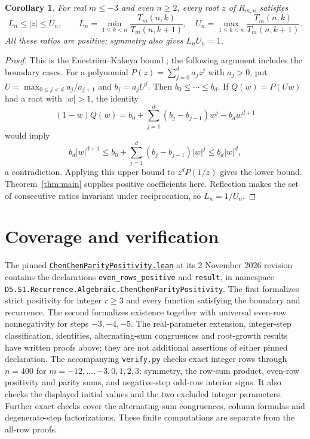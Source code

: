 \documentclass[11pt]{article}
\newtheorem{corollary}[theorem]{Corollary}
\begin{document}
\begin{corollary}\label{cor:annulus}
For real $m\leq-3$ and even $n\geq2$, every root $z$ of
$R_{m,n}$ satisfies
\[
 L_n\leq |z|\leq U_n,\qquad
 L_n=\min_{1\leq k<n}\frac{T_m(n,k)}{T_m(n,k+1)},\quad
 U_n=\max_{1\leq k<n}\frac{T_m(n,k)}{T_m(n,k+1)}.
\]
All these ratios are positive; symmetry also gives $L_nU_n=1$.
\end{corollary}
\begin{proof}
This is the Enestr\"om--Kakeya bound \cite{kakeya}; the following
argument includes the boundary cases. For a polynomial
$P(z)=\sum_{j=0}^d a_jz^j$ with $a_j>0$, put
$U=\max_{0\leq j<d}a_j/a_{j+1}$ and $b_j=a_jU^j$.
Then $b_0\leq\cdots\leq b_d$. If
$Q(w)=P(Uw)$ had a root with $|w|>1$, the identity
\[
 (1-w)Q(w)=b_0+\sum_{j=1}^d(b_j-b_{j-1})w^j-b_dw^{d+1}
\]
would imply
\[
 b_d|w|^{d+1}
 \leq b_0+\sum_{j=1}^d(b_j-b_{j-1})|w|^j
 \leq b_d|w|^d,
\]
a contradiction. Applying this upper bound to $z^dP(1/z)$
gives the lower bound. Theorem~\ref{thm:main} supplies positive
coefficients here. Reflection makes the set of consecutive ratios
invariant under reciprocation, so $L_n=1/U_n$.
\end{proof}


\section{Coverage and verification}

The pinned
\href{https://github.com/the-omega-institute/trureturing/blob/66a0495cbdf1bb9b42d715c1b3cd3365862896fa/D5/S1/Recurrence/Algebraic/ChenChenParityPositivity.lean}{\texttt{ChenChenParityPositivity.lean}}
at its 2 November 2026 revision contains the declarations
\texttt{even\_rows\_positive} and \texttt{result}, in namespace
\nolinkurl{D5.S1.Recurrence.Algebraic.ChenChenParityPositivity}.
The first formalizes strict positivity for integer $r\geq3$ and
every function satisfying the boundary and recurrence. The second
formalizes existence together with universal even-row nonnegativity
for steps $-3,-4,-5$. The real-parameter extension, integer-step
classification, identities, alternating-sum congruences and root-growth
results have written proofs above; they are not additional assertions
of either pinned declaration.
The accompanying \texttt{verify.py} checks exact integer rows through
$n=400$ for $m=-12,\ldots,-3,0,1,2,3$: symmetry, the row-sum
product, even-row positivity and parity sums, and negative-step
odd-row interior signs. It also checks the displayed initial values
and the two excluded integer parameters. Further exact checks cover
the alternating-sum congruences, column formulas and degenerate-step
factorizations. These finite computations are separate from the all-row proofs.
\end{document}

